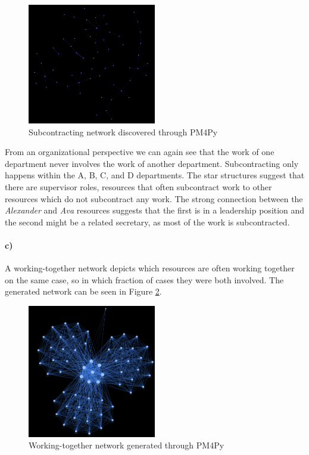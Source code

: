 \documentclass[12pt]{report}
\begin{document}
\begin{figure}[h]
    \centering
    \includegraphics[width=0.5\textwidth]{figures/q2_subcontracting.png}
    \caption{Subcontracting network discovered through PM4Py}
    \label{fig:figures-q2_subcontracting-png}
\end{figure}

From an organizational perspective we can again see that the work of one department never involves the work of another department. Subcontracting only happens within the A, B, C, and D departments. The star structures suggest that there are supervisor roles, resources that often subcontract work to other resources which do not subcontract any work. The strong connection between the \emph{Alexander} and \emph{Ava} resources suggests that the first is in a leadership position and the second might be a related secretary, as most of the work is subcontracted.

\paragraph{c)} 

A working-together network depicts which resources are often working together on the same case, so in which fraction of cases they were both involved. The generated network can be seen in Figure \ref{fig:figures-q2_working_together-png}.

\begin{figure}[h]
    \centering
    \includegraphics[width=0.5\textwidth]{figures/q2_working_together.png}
    \caption{Working-together network generated through PM4Py}
    \label{fig:figures-q2_working_together-png}
\end{figure}
\end{document}
